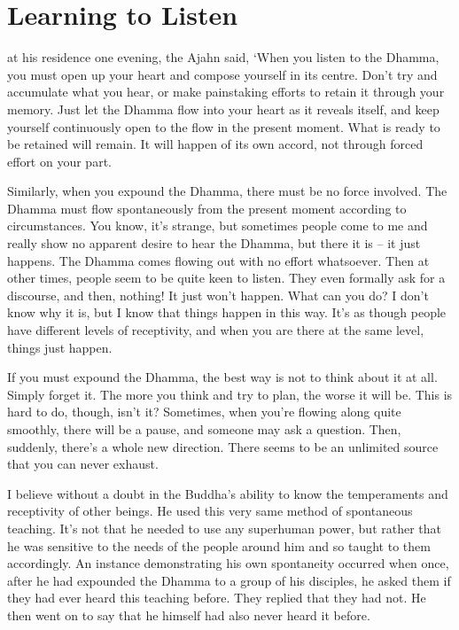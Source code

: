 
\chapter{Learning to Listen}

\vspace*{0.5\baselineskip}
 at his residence one evening, the Ajahn said, `When you listen to the Dhamma, you must open up your heart and compose yourself in its centre. Don't try and accumulate what you hear, or make painstaking efforts to retain it through your memory. Just let the Dhamma flow into your heart as it reveals itself, and keep yourself continuously open to the flow in the present moment. What is ready to be retained will remain. It will happen of its own accord, not through forced effort on your part.

Similarly, when you expound the Dhamma, there must be no force involved. The Dhamma must flow spontaneously from the present moment according to circumstances. You know, it's strange, but sometimes people come to me and really show no apparent desire to hear the Dhamma, but there it is -- it just happens. The Dhamma comes flowing out with no effort whatsoever. Then at other times, people seem to be quite keen to listen. They even formally ask for a discourse, and then, nothing! It just won't happen. What can you do? I don't know why it is, but I know that things happen in this way. It's as though people have different levels of receptivity, and when you are there at the same level, things just happen.

If you must expound the Dhamma, the best way is not to think about it at all. Simply forget it. The more you think and try to plan, the worse it will be. This is hard to do, though, isn't it? Sometimes, when you're flowing along quite smoothly, there will be a pause, and someone may ask a question. Then, suddenly, there's a whole new direction. There seems to be an unlimited source that you can never exhaust.

I believe without a doubt in the Buddha's ability to know the temperaments and receptivity of other beings. He used this very same method of spontaneous teaching. It's not that he needed to use any superhuman power, but rather that he was sensitive to the needs of the people around him and so taught to them accordingly. An instance demonstrating his own spontaneity occurred when once, after he had expounded the Dhamma to a group of his disciples, he asked them if they had ever heard this teaching before. They replied that they had not. He then went on to say that he himself had also never heard it before.

